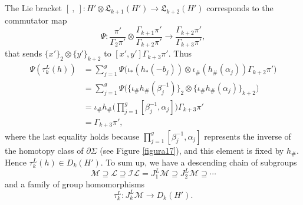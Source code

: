 \documentclass[10pt]{amsart}
\numberwithin{equation}{section}
\numberwithin{equation}{section}
\theoremstyle{definition}
\begin{document}
\noindent  The Lie bracket  $\left[\ ,\ \right]:H'\otimes\mathfrak{L}_{k+1}(H')\longrightarrow\mathfrak{L}_{k+2}(H')$ corresponds to the commutator map 
\begin{equation}\label{ecuacion3.14}%
\Psi:\frac{\pi'}{\Gamma_2\pi'}\otimes\frac{\Gamma_{k+1}\pi'}{\Gamma_{k+2}\pi'}\longrightarrow\frac{\Gamma_{k+2}\pi'}{\Gamma_{k+3}\pi'},
\end{equation}
that sends $\{x'\}_{2}\otimes\{y'\}_{k+2}$ to $[x',y']\Gamma_{k+3}\pi'$. Thus
\begin{align*}\label{ecuacion3.15}%
\Psi(\tau_k^L(h))&=\sum_{j=1}^g\Psi\Big(\iota_{*}(h_{*}(-b_j))\otimes\iota_{\#}(h_{\#}(\alpha_j))\Gamma_{k+2}\pi'\Big)\\
								 &=\sum_{j=1}^g\Psi\Big(\{\iota_{\#}h_{\#}(\beta^{-1}_j)\}_2\otimes\{\iota_{\#}h_{\#}(\alpha_j)\}_{k+2}\Big)\\
								 &=\iota_{\#}h_{\#}\Big(\prod_{j=1}^g \left[\beta^{-1}_j,\alpha_j\right]\Big)\Gamma_{k+3}\pi'\\
								 &=\Gamma_{k+3}\pi',
\end{align*}
where the last equality holds because $\prod_{j=1}^g \left[\beta^{-1}_j,\alpha_j\right]$ represents the inverse of the homotopy class of $\partial\Sigma$ (see Figure \ref{figura17}), and this element is fixed by $h_{\#}$. Hence $\tau_k^L(h)\in D_k(H')$. To sum up, we have a  descending chain  of subgroups
\begin{equation}\label{ecuacion3.8}%
\mathcal{M}\supseteq\mathcal{L}\supseteq \mathcal{IL}=J_1^L\mathcal{M}\supseteq J_2^L\mathcal{M}\supseteq\cdots
\end{equation} 
and a family of group homomorphisms 
\begin{equation}\label{ecuacion3.16}%
\tau_k^L:J_k^L\mathcal{M}\rightarrow D_k(H').
\end{equation}
\end{document}
